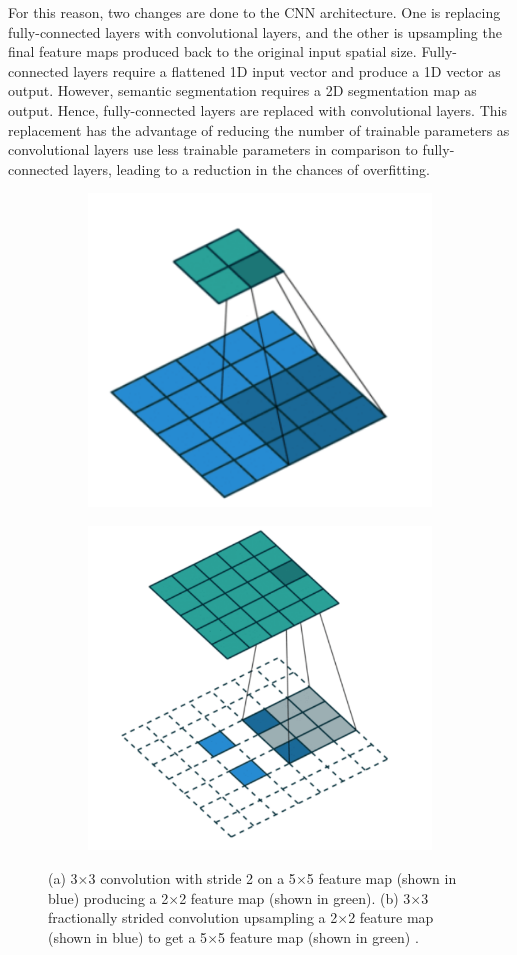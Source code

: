 For this reason, two changes are done to the CNN architecture. One is replacing fully-connected layers with convolutional layers, and the other is upsampling the final feature maps produced back to the original input spatial size. Fully-connected layers require a flattened 1D input vector and produce a 1D vector as output. However, semantic segmentation requires a 2D segmentation map as output. Hence, fully-connected layers are replaced with convolutional layers. This replacement has the advantage of reducing the number of trainable parameters as convolutional layers use less trainable parameters in comparison to fully-connected layers, leading to a reduction in the chances of overfitting.

	\begin{figure}[h]
	\centering
		\begin{subfigure}{.45\textwidth}
  			\centering
  			\includegraphics[width=.7\linewidth]{images/reg_conv}
  			\caption{}
  			\label{Fig:tranconva}
		\end{subfigure}
		\begin{subfigure}{.45\textwidth}
  			\centering
  			\includegraphics[width=.7\linewidth]{images/tran_conv}
  			\caption{}
  			\label{Fig:tranconvb}
		\end{subfigure}
		\caption{(a) 3$\times$3 convolution with stride 2 on a 5$\times$5 feature map (shown in blue) producing a 2$\times$2 feature map (shown in green). (b) 3$\times$3 fractionally strided convolution upsampling a 2$\times$2 feature map (shown in blue) to get a 5$\times$5 feature map (shown in green) \cite{diff_conv}.}
		\label{Fig:tranconv}
	\end{figure}

